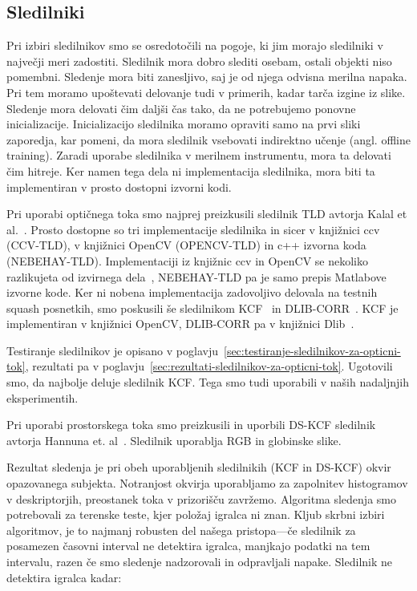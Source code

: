 \subsection{Sledilniki}
Pri izbiri sledilnikov smo se osredotočili na pogoje, ki jim morajo sledilniki v največji meri zadostiti. Sledilnik mora dobro slediti osebam, ostali objekti niso pomembni. Sledenje mora biti zanesljivo, saj je od njega odvisna merilna napaka. Pri tem moramo upoštevati delovanje tudi v primerih, kadar tarča izgine iz slike. Sledenje mora delovati čim daljši čas tako, da ne potrebujemo ponovne inicializacije. Inicializacijo sledilnika moramo opraviti samo na prvi sliki zaporedja, kar pomeni, da mora sledilnik vsebovati indirektno učenje (angl. offline training). Zaradi uporabe sledilnika v merilnem instrumentu, mora ta delovati čim hitreje. Ker namen tega dela ni implementacija sledilnika, mora biti ta implementiran v prosto dostopni izvorni kodi. 

Pri uporabi optičnega toka smo najprej preizkusili sledilnik TLD avtorja Kalal et al.~\cite{kalal2012tracking}. Prosto dostopne so tri implementacije sledilnika in sicer v knjižnici ccv (CCV-TLD), v knjižnici OpenCV (OPENCV-TLD) in c++ izvorna koda (NEBEHAY-TLD). Implementaciji iz knjižnic ccv in OpenCV se nekoliko razlikujeta od izvirnega dela~\cite{kalal2012tracking}, NEBEHAY-TLD pa je samo prepis Matlabove izvorne kode.  Ker ni nobena implementacija zadovoljivo delovala na testnih squash posnetkih, smo poskusili še sledilnikom KCF~\cite{danelljan2014adaptive} in DLIB-CORR~\cite{danelljan2014accurate}. KCF je implementiran v knjižnici OpenCV, DLIB-CORR pa v knjižnici Dlib~\cite{king2009dlib}.

Testiranje sledilnikov je opisano v poglavju~\ref{sec:testiranje-sledilnikov-za-opticni-tok}, rezultati pa v poglavju~\ref{sec:rezultati-sledilnikov-za-opticni-tok}. Ugotovili smo, da najbolje deluje sledilnik KCF. Tega smo tudi uporabili v naših nadaljnjih eksperimentih.

Pri uporabi prostorskega toka smo preizkusili in uporbili DS-KCF sledilnik avtorja Hannuna et. al~\cite{hannuna2016ds}. Sledilnik uporablja RGB in globinske slike.


Rezultat sledenja je pri obeh uporabljenih sledilnikih (KCF in DS-KCF) okvir opazovanega subjekta. Notranjost okvirja uporabljamo za zapolnitev histogramov v deskriptorjih, preostanek toka v prizorišču zavržemo. Algoritma sledenja smo potrebovali za terenske teste, kjer položaj igralca ni znan. Kljub skrbni izbiri algoritmov, je to najmanj robusten del našega pristopa---če sledilnik za posamezen časovni interval ne detektira igralca, manjkajo podatki na tem intervalu, razen če smo sledenje nadzorovali in odpravljali napake. Sledilnik ne detektira igralca kadar:

